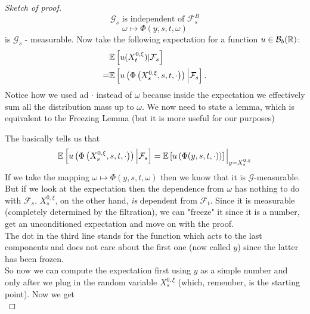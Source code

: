 \begin{ProofBox}
\begin{proof}[Sketch of proof]
\begin{equation*}
            \mathcal{G}_s \text{ is independent of } \mathcal{F}_s^B
        \end{equation*}
        \begin{equation*}
            \omega \mapsto \Phi(y,s,t,\omega)
        \end{equation*}
        is $\mathcal{G}_s$ - measurable. 
		Now take the following expectation for a function $u\in\mathcal{B}_b(\mathbb{R})$:
		\begin{align*}
			&\mathbb{E}\left[{u(X_t^{0,\xi})|\mathcal{F}_s}\right]\\
			=&\mathbb{E}\left[{u\left(\Phi\left(X_s^{0,\xi},s,t,\cdot\right)\right)\Big|\mathcal{F}_s}\right].
		\end{align*}
		Notice how we used ad $\cdot$ instead of $\omega$ because inside the expectation we effectively sum all the distribution mass up to $\omega$. We now
		need to state a lemma, which is equivalent to the Freezing Lemma (but it is more useful for our purposes)
        \begin{PropBox}
            \begin{Lemma} 
            \end{Lemma}
        \end{PropBox}
        The basically tells us that 
        \begin{equation*}
        	\mathbb{E}\left[{u\left(\Phi\left(X_s^{0,\xi},s,t,\cdot\right)\right)\Big|\mathcal{F}_s}\right]=\mathbb{E}\left[{u\left(\Phi(y,s,t,\cdot)\right)}\right]\Big|_{y=X_s^{0,\xi}}
        \end{equation*}
        If we take the mapping $\omega\mapsto\Phi(y,s,t,\omega)$ then we know that it is $\mathcal{G}$-measurable. But if we look at the expectation then the dependence from $\omega$ has nothing to do with $\mathcal{F}_s$. $X_s^{0,\xi}$, on the other hand, \textit{is} dependent from $\mathcal{F}_t$.
        Since it is measurable (completely determined by the filtration), we can "freeze" it since it is a number, get an unconditioned expectation and move on with the proof. \\
        The dot in the third line stands for the function which acts to the last components and does not care about the first one (now called $y$) since the latter has been frozen. \\
        So now we can compute the expectation first using $y$ as a simple number and only after we plug in the random variable $X_s^{0,\xi}$ (which, remember, is the starting point). Now we get
        \begin{equation*}

\end{equation*}
\end{proof}
\end{ProofBox}
